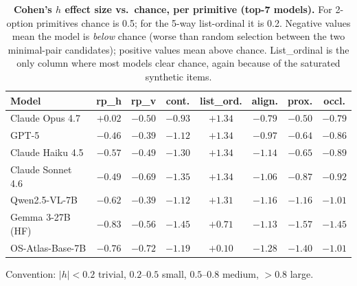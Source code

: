\begin{table}[t]
\centering
\scriptsize
\begin{threeparttable}
\caption{\textbf{Cohen's $h$ effect size vs.\ chance, per primitive
(top-7 models).} For 2-option primitives chance is 0.5; for the 5-way
list-ordinal it is 0.2. Negative values mean the model is \emph{below}
chance (worse than random selection between the two minimal-pair
candidates); positive values mean above chance. List\_ordinal is the
only column where most models clear chance, again because of the
saturated synthetic items.}
\label{tab:cohens-h}
\begin{tabular}{@{}lccccccc@{}}
\toprule
\textbf{Model} & \textbf{rp\_h} & \textbf{rp\_v} & \textbf{cont.} & \textbf{list\_ord.} & \textbf{align.} & \textbf{prox.} & \textbf{occl.} \\
\midrule
Claude Opus 4.7   & $+0.02$ & $-0.50$ & $-0.93$ & $\mathbf{+1.34}$ & $-0.79$ & $-0.50$ & $-0.79$ \\
GPT-5             & $-0.46$ & $-0.39$ & $-1.12$ & $\mathbf{+1.34}$ & $-0.97$ & $-0.64$ & $-0.86$ \\
Claude Haiku 4.5  & $-0.57$ & $-0.49$ & $-1.30$ & $\mathbf{+1.34}$ & $-1.14$ & $-0.65$ & $-0.89$ \\
Claude Sonnet 4.6 & $-0.49$ & $-0.69$ & $-1.35$ & $\mathbf{+1.34}$ & $-1.06$ & $-0.87$ & $-0.92$ \\
Qwen2.5-VL-7B     & $-0.62$ & $-0.39$ & $-1.12$ & $\mathbf{+1.31}$ & $-1.16$ & $-1.16$ & $-1.01$ \\
Gemma 3-27B (HF)  & $-0.83$ & $-0.56$ & $-1.45$ & $+0.71$         & $-1.13$ & $-1.57$ & $-1.45$ \\
OS-Atlas-Base-7B  & $-0.76$ & $-0.72$ & $-1.19$ & $+0.10$         & $-1.28$ & $-1.40$ & $-1.01$ \\
\bottomrule
\end{tabular}
\begin{tablenotes}
\footnotesize
\item Convention: $|h|{<}0.2$ trivial, $0.2$--$0.5$ small, $0.5$--$0.8$
medium, $>{0.8}$ large.
\end{tablenotes}
\end{threeparttable}
\end{table}


